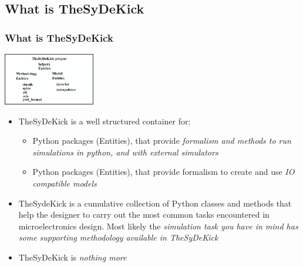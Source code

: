 \documentclass{sdkslides}
\newcommand{\sectname}{Section Name}
\begin{document}
\renewcommand{\sectname}{What is TheSyDeKick}
\subsection*{\sectname}
\begin{frame}[t]
    \frametitle{\sectname}
    \begin{center}
        \includegraphics[width=0.3\textwidth]{Pics/TheSyDeKick-entity-principles.eps}
    \end{center}
        \begin{itemize}
            \item TheSyDeKick is a well structured container for: 
                \begin{itemize}
                    \item Python packages (Entities), that provide
                        \emph{formalism and methods to run simulations in
                        python, and with external simulators}
                    \item Python packages (Entities), that provide
                        formalism to create and use \emph{IO compatible models}
                \end{itemize}
            \item TheSydeKick is a cumulative collection of Python classes and
                methods that help the designer to carry out the most common
                tasks encountered in microelectronics design. Most likely the
                \emph{simulation task you have in mind has some supporting
                    methodology available in TheSyDeKick}
            \item TheSyDeKick is \emph{nothing more}
        \end{itemize}
\end{frame}

\renewcommand{\sectname}{What is it?}
\end{document}
